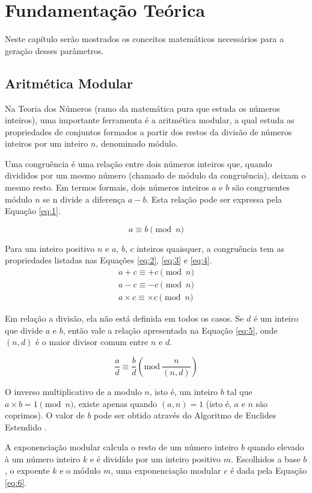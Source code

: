 \chapter{Fundamentação Teórica}\label{cap:fundamentacao}
Neste capítulo serão mostrados os conceitos matemáticos necessários para a geração desses parâmetros. 

%
%
\section{Aritmética Modular} \label{sec:aritmeticamodular} %
Na Teoria dos Números \cite{Niven:2014} (ramo da matemática pura que estuda os números inteiros), uma importante ferramenta é a aritmética modular,  a qual estuda as propriedades de conjuntos formados a partir dos restos da divisão de números inteiros por um inteiro $n$, denominado módulo.
\par Uma congruência é  uma relação entre dois números inteiros que, quando divididos por um mesmo número (chamado de módulo da congruência), deixam o mesmo resto.  Em termos formais, dois números inteiros \(a\) e \(b\) são congruentes módulo \(n\) se n divide a diferença \(a - b\).  Esta relação pode ser expressa pela Equação \ref{eq:1}.

\begin{equation}
  a \equiv b \pmod n \label{eq:1}
\end{equation}

Para um inteiro positivo \(n\) e \(a\), \(b\), \(c\) inteiros quaisquer, a congruência tem as propriedades listadas nas Equações \ref{eq:2}, \ref{eq:3} e \ref{eq:4}.
\begin{eqnarray}
  a + c \equiv + c \pmod n \label{eq:2} \\
  a - c \equiv - c \pmod n \label{eq:3} \\
  a \times c \equiv \times c \pmod n \label{eq:4}
\end{eqnarray}

Em relação a divisão, ela não está definida em todos os casos. Se \(d\) é um inteiro que divide \(a\) e \(b\), então vale a relação apresentada na Equação \ref{eq:5}, onde \((n, d)\) é o maior divisor comum entre \(n\) e \(d\).

\begin{equation}
  \frac{a}{d} \equiv \frac{b}{d}\left(\mbox{mod}\ \frac{n}{(n,d)}\right) \label{eq:5}%
\end{equation}

O inverso multiplicativo de a modulo \(n\), isto é, um inteiro \(b\) tal que \(a \times b = 1 \pmod  n\), existe apenas quando \((a, n) = 1\) (isto é, $a$ e $n$ são coprimos). O valor de \(b\) pode ser obtido através do Algoritmo de Euclides Estendido \cite{Halim:2013}.
\par A exponenciação modular calcula o resto de um número inteiro \(b\) quando elevado à um número inteiro \(k\) e é dividído por um inteiro positivo \(m\). Escolhidos a base \(b\), o expoente \(k\) e o módulo \(m\), uma exponenciação modular \(c\) é dada pela Equação \ref{eq:6}.


